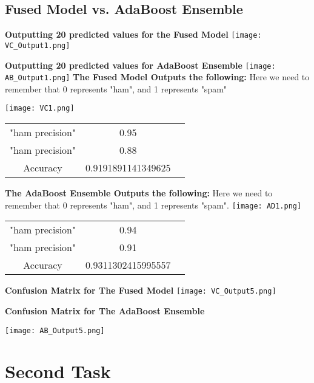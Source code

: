 \documentclass{article}
\begin{document}
\vspace{2cm}
\subsection{Fused Model vs. AdaBoost Ensemble}
\vspace{2cm}
\textbf{Outputting 20 predicted values for the Fused Model}
\vspace{2cm}
\texttt{[image: VC\_Output1.png]}


\textbf{Outputting 20 predicted values for AdaBoost Ensemble}
\vspace{6cm}
\texttt{[image: AB\_Output1.png]}
\textbf{The Fused Model Outputs the following: }
Here we need to remember that 0 represents "ham", and 1 represents "spam"

\texttt{[image: VC1.png]}
\begin{center}
\begin{tabular}{ |c|c|c| } 
 \hline
 "ham precision" & 0.95  \\ 
 "ham precision" & 0.88 \\ 
 Accuracy  & 0.9191891141349625 \\ 
 \hline
\end{tabular}
\end{center}
\vspace{1cm}
\textbf{The AdaBoost Ensemble Outputs the following: } Here we need to remember that 0 represents "ham", and 1 represents "spam".
\texttt{[image: AD1.png]}



\begin{center}
\begin{tabular}{ |c|c|c| } 
 \hline
 "ham precision" & 0.94  \\ 
 "ham precision" & 0.91 \\ 
 Accuracy  & 0.9311302415995557 \\ 
 \hline
\end{tabular}
\end{center}

\vspace{7cm}
\centering
\textbf{Confusion Matrix for The Fused Model}
\vspace{0.5cm}
\texttt{[image: VC\_Output5.png]}

\textbf{Confusion Matrix for The AdaBoost Ensemble}

\texttt{[image: AB\_Output5.png]}

\section{Second Task}
\end{document}
